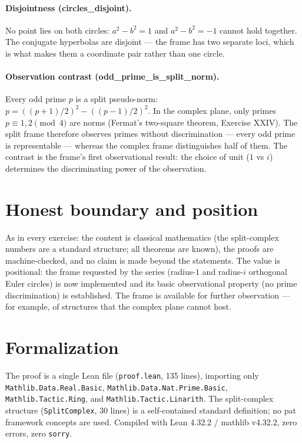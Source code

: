 \documentclass[sigplan,10pt,anonymous,review]{acmart}
\begin{document}
\paragraph{Disjointness (circles\_disjoint).} No point lies on both
circles: $a^2 - b^2 = 1$ and $a^2 - b^2 = -1$ cannot hold together. The
conjugate hyperbolas are disjoint --- the frame has two separate loci,
which is what makes them a coordinate pair rather than one circle.

\paragraph{Observation contrast (odd\_prime\_is\_split\_norm).}
Every odd prime $p$ is a split pseudo-norm:
$p = ((p+1)/2)^2 - ((p-1)/2)^2$. In the complex plane, only primes
$p \equiv 1, 2 \pmod 4$ are norms (Fermat's two-square theorem, Exercise
XXIV). The split frame therefore observes primes without discrimination
--- every odd prime is representable --- whereas the complex frame
distinguishes half of them. The contrast is the frame's first
observational result: the choice of unit ($1$ vs $i$) determines the
discriminating power of the observation.

\section{Honest boundary and position}

As in every exercise: the content is classical mathematics (the
split-complex numbers are a standard structure; all theorems are
known), the proofs are machine-checked, and no claim is made beyond the
statements. The value is positional: the frame requested by the series
(radius-$1$ and radius-$i$ orthogonal Euler circles) is now implemented
and its basic observational property (no prime discrimination) is
established. The frame is available for further observation --- for
example, of structures that the complex plane cannot host.

\section{Formalization}

The proof is a single Lean file (\texttt{proof.lean}, 135 lines),
importing only \texttt{Mathlib.Data.Real.Basic},
\texttt{Mathlib.Data.Nat.Prime.Basic}, \texttt{Mathlib.Tactic.Ring}, and
\texttt{Mathlib.Tactic.Linarith}. The split-complex structure
(\texttt{SplitComplex}, 30 lines) is a self-contained standard
definition; no pat framework concepts are used. Compiled with Lean
4.32.2 / mathlib v4.32.2, zero errors, zero \texttt{sorry}.
\end{document}
